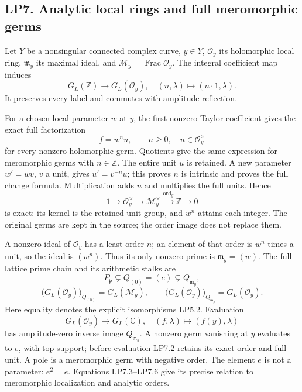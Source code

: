 \subsection{LP7. Analytic local rings and full meromorphic
germs}\label{lp7.-analytic-local-rings-and-full-meromorphic-germs}

Let \(Y\) be a nonsingular connected complex curve, \(y\in Y\),
\(\mathcal O_y\) its holomorphic local ring, \(\mathfrak m_y\) its
maximal ideal, and \(\mathcal M_y=\operatorname{Frac}\mathcal O_y\). The
integral coefficient map induces \[
G_L(\mathbb Z)\to G_L(\mathcal O_y),\quad(n,\lambda)\mapsto(n\cdot1,\lambda).
\tag{LP7.1}
\] It preserves every label and commutes with amplitude reflection.

For a chosen local parameter \(w\) at \(y\), the first nonzero Taylor
coefficient gives the exact full factorization \[
f=w^n u,\qquad n\ge0,\quad u\in\mathcal O_y^\times
\tag{LP7.2}
\] for every nonzero holomorphic germ. Quotients give the same
expression for meromorphic germs with \(n\in\mathbb Z\). The entire unit
\(u\) is retained. A new parameter \(w'=wv\), \(v\) a unit, gives
\(u'=v^{-n}u\); this proves \(n\) is intrinsic and proves the full
change formula. Multiplication adds \(n\) and multiplies the full units.
Hence \[
1\to\mathcal O_y^\times\to\mathcal M_y^\times
\xrightarrow{\operatorname{ord}_y}\mathbb Z\to0
\tag{LP7.3}
\] is exact: its kernel is the retained unit group, and \(w^n\) attains
each integer. The original germs are kept in the source; the order image
does not replace them.

A nonzero ideal of \(\mathcal O_y\) has a least order \(n\); an element
of that order is \(w^n\) times a unit, so the ideal is \((w^n)\). Thus
its only nonzero prime is \(\mathfrak m_y=(w)\). The full lattice prime
chain and its arithmetic stalks are \[
P_{\mathfrak p}\subsetneq Q_{(0)}=(e)\subsetneq Q_{\mathfrak m_y},
\tag{LP7.4}
\] \[
\bigl(G_L(\mathcal O_y)\bigr)_{Q_{(0)}}=G_L(\mathcal M_y),\qquad
\bigl(G_L(\mathcal O_y)\bigr)_{Q_{\mathfrak m_y}}=G_L(\mathcal O_y).
\tag{LP7.5}
\] Here equality denotes the explicit isomorphisms LP5.2. Evaluation \[
G_L(\mathcal O_y)\to G_L(\mathbb C),\quad(f,\lambda)\mapsto(f(y),\lambda)
\tag{LP7.6}
\] has amplitude-zero inverse image \(Q_{\mathfrak m_y}\). A nonzero
germ vanishing at \(y\) evaluates to \(e\), with top support; before
evaluation LP7.2 retains its exact order and full unit. A pole is a
meromorphic germ with negative order. The element \(e\) is not a
parameter: \(e^2=e\). Equations LP7.3--LP7.6 give its precise relation
to meromorphic localization and analytic orders.

